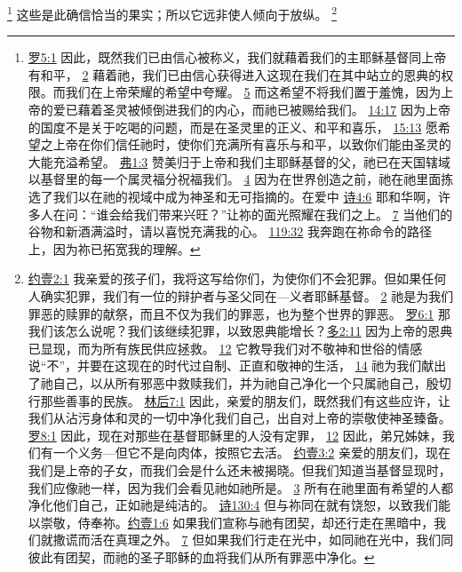 \documentclass[12pt, a4paper, oneside]{ctexart}
\begin{document}
	\footnote {
		\href{https://biblehub.com/romans/5-1.htm}{罗5:1} 因此，既然我们已由信心被称义，我们就藉着我们的主耶稣基督同上帝有和平，
		\href{https://biblehub.com/romans/5-2.htm}{2} 藉着祂，我们已由信心获得进入这现在我们在其中站立的恩典的权限。而我们在上帝荣耀的希望中夸耀。
		\href{https://biblehub.com/romans/5-5.htm}{5} 而这希望不将我们置于羞愧，因为上帝的爱已藉着圣灵被倾倒进我们的内心，而祂已被赐给我们。
		\href{https://biblehub.com/romans/14-17.htm}{14:17} 因为上帝的国度不是关于吃喝的问题，而是在圣灵里的正义、和平和喜乐，
		\href{https://biblehub.com/romans/15-13.htm}{15:13} 愿希望之上帝在你们信任祂时，使你们充满所有喜乐与和平，以致你们能由圣灵的大能充溢希望。
		\href{https://biblehub.com/ephesians/1-3.htm}{弗1:3} 赞美归于上帝和我们主耶稣基督的父，祂已在天国辖域以基督里的每一个属灵福分祝福我们。
		\href{https://biblehub.com/ephesians/1-4.htm}{4} 因为在世界创造之前，祂在祂里面拣选了我们以在祂的视域中成为神圣和无可指摘的。在爱中
		\href{https://biblehub.com/psalms/4-6.htm}{诗4:6} 耶和华啊，许多人在问：“谁会给我们带来兴旺？”让祢的面光照耀在我们之上。
		\href{https://biblehub.com/psalms/4-7.htm}{7} 当他们的谷物和新酒满溢时，请以喜悦充满我的心。
		\href{https://biblehub.com/psalms/119-32.htm}{119:32} 我奔跑在祢命令的路径上，因为祢已拓宽我的理解。
	}
	这些是此确信恰当的果实；所以它远非使人倾向于放纵。
	\footnote {
		\href{https://biblehub.com/1_john/2-1.htm}{约壹2:1} 我亲爱的孩子们，我将这写给你们，为使你们不会犯罪。但如果任何人确实犯罪，我们有一位的辩护者与圣父同在---义者耶稣基督。
		\href{https://biblehub.com/1_john/2-2.htm}{2} 祂是为我们罪恶的赎罪的献祭，而且不仅为我们的罪恶，也为整个世界的罪恶。
		\href{https://biblehub.com/romans/6-1.htm}{罗6:1} 那我们该怎么说呢？我们该继续犯罪，以致恩典能增长？\href{https://biblehub.com/titus/2-11.htm}{多2:11} 因为上帝的恩典已显现，而为所有族民供应拯救。
		\href{https://biblehub.com/titus/2-12.htm}{12} 它教导我们对不敬神和世俗的情感说“不”，并要在这现在的时代过自制、正直和敬神的生活，
		\href{https://biblehub.com/titus/2-14.htm}{14} 祂为我们献出了祂自己，以从所有邪恶中救赎我们，并为祂自己净化一个只属祂自己，殷切行那些善事的民族。
		\href{https://biblehub.com/2_corinthians/7-1.htm}{林后7:1} 因此，亲爱的朋友们，既然我们有这些应许，让我们从沾污身体和灵的一切中净化我们自己，出自对上帝的崇敬使神圣臻备。
		\href{https://biblehub.com/romans/8-1.htm}{罗8:1} 因此，现在对那些在基督耶稣里的人没有定罪，
		\href{https://biblehub.com/romans/8-12.htm}{12} 因此，弟兄姊妹，我们有一个义务---但它不是向肉体，按照它去活。
		\href{https://biblehub.com/1_john/3-2.htm}{约壹3:2} 亲爱的朋友们，现在我们是上帝的子女，而我们会是什么还未被揭晓。但我们知道当基督显现时，我们应像祂一样，因为我们会看见祂如祂所是。
		\href{https://biblehub.com/1_john/3-3.htm}{3} 所有在祂里面有希望的人都净化他们自己，正如祂是纯洁的。
		\href{https://biblehub.com/psalms/130-4.htm}{诗130:4} 但与祢同在就有饶恕，以致我们能以崇敬，侍奉祢。\href{https://biblehub.com/1_john/1-6.htm}{约壹1:6} 如果我们宣称与祂有团契，却还行走在黑暗中，我们就撒谎而活在真理之外。
		\href{https://biblehub.com/1_john/1-7.htm}{7} 但如果我们行走在光中，如同祂在光中，我们同彼此有团契，而祂的圣子耶稣的血将我们从所有罪恶中净化。
	}
\end{document}
